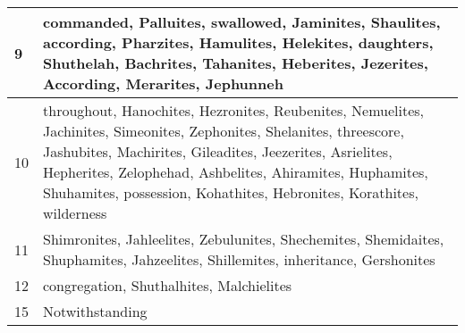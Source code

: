 \begin{center}
\begin{longtable}{l|p{3.75in}}
9 & commanded, Palluites, swallowed, Jaminites, Shaulites, according, Pharzites, Hamulites, Helekites, daughters, Shuthelah, Bachrites, Tahanites, Heberites, Jezerites, According, Merarites, Jephunneh\\ \hline 
10 & throughout, Hanochites, Hezronites, Reubenites, Nemuelites, Jachinites, Simeonites, Zephonites, Shelanites, threescore, Jashubites, Machirites, Gileadites, Jeezerites, Asrielites, Hepherites, Zelophehad, Ashbelites, Ahiramites, Huphamites, Shuhamites, possession, Kohathites, Hebronites, Korathites, wilderness\\ \hline 
11 & Shimronites, Jahleelites, Zebulunites, Shechemites, Shemidaites, Shuphamites, Jahzeelites, Shillemites, inheritance, Gershonites\\ \hline 
12 & congregation, Shuthalhites, Malchielites\\ \hline 
15 & Notwithstanding\\ \hline 
\end{longtable}
\end{center}





